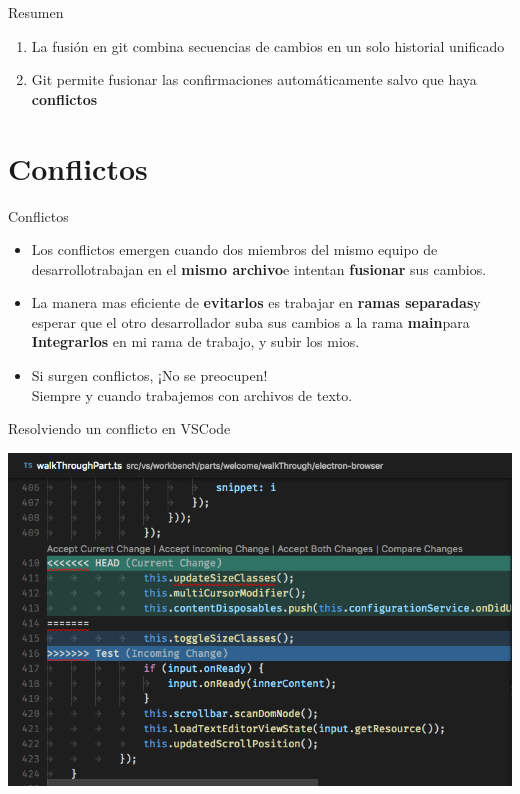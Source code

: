 \documentclass{beamer}
\begin{document}
    \begin{frame}{Resumen}
    \begin{enumerate}
        \item La fusión en git combina secuencias de cambios en un solo historial unificado\pause
        \item Git permite fusionar las confirmaciones automáticamente salvo que haya \textbf{conflictos}
    \end{enumerate}
    \end{frame}
    
    
    \section{Conflictos}
    \begin{frame}{Conflictos}
    \begin{itemize}
        \item Los conflictos emergen cuando dos miembros del mismo equipo de desarrollo\pause  trabajan en el \textbf{mismo archivo}\pause  e intentan \textbf{fusionar} sus cambios.\pause
        \item La manera mas eficiente de \textbf{evitarlos} es trabajar en \textbf{ramas separadas}\pause  y esperar que el otro desarrollador suba sus cambios a la rama \textbf{main}\pause  para \textbf{Integrarlos} en mi rama de trabajo, y subir los mios.\pause
        \item Si surgen conflictos, ¡No se preocupen!\pause\\Siempre y cuando trabajemos con archivos de texto.
    \end{itemize}
    \end{frame}
    \begin{frame}{Resolviendo un conflicto en VSCode}
        \begin{center}
            \includegraphics[width=\textwidth]{merge-conflict.png}
        \end{center}
    \end{frame}
    
\end{document}
